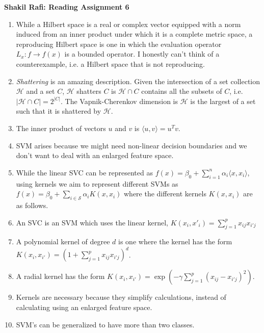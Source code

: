 \documentclass{article}
\begin{document}
\textbf{Shakil Rafi: Reading Assignment 6}
\begin{enumerate}
    \item While a Hilbert space is a real or complex vector equipped with a norm induced from an inner product under which it is a complete metric space, a reproducing Hilbert space is one in which the evaluation operator $L_x: f \rightarrow f(x)$ is a bounded operator. I honestly can't think of a counterexample, i.e. a Hilbert space that is not reproducing.
    \item \textit{Shattering} is an amazing description. Given the intersection of a set collection $\mathcal{H}$ and a set $C$, $\mathcal{H}$ shatters $C$ is $\mathcal{H} \cap C$ contains all the subsets of $C$, i.e. $|\mathcal{H} \cap C| = 2^{|C|}$. The Vapnik-Cherenkov dimension is $\mathcal{H}$ is the largest of a set such that it is shattered by $\mathcal{H}$.
    \item The inner product of vectors $u$ and $v$ is $\langle u,v \rangle = u^Tv$.
    \item SVM arises because we might need non-linear decision boundaries and we don't want to deal with an enlarged feature space.
    \item While the linear SVC can be represented as $f(x) = \beta_0+\sum^n_{i=1} \alpha_i\langle x,x_i \rangle$, using kernels we aim to represent different SVMs as $f(x) = \beta_0 + \sum_{i\in \mathcal{S}} \alpha_i K(x,x_i)$ where the different kernels $K(x,x_i)$ are as follows.
    \item An SVC is an SVM which uses the linear kernel, $K(x_i,x'_i) = \sum^p_{j=1}x_{ij}x_{i'j}$
    \item A polynomial kernel of degree $d$ is one where the kernel has the form $K(x_i,x_{i'}) = (1+\sum^p_{j=1} x_{ij}x_{i'j})^d$.
    \item A radial kernel has the form $K(x_i,x_{i'}) = \exp(-\gamma \sum^p_{j=1}(x_{ij}-x_{i'j})^2)$.
    \item Kernels are necessary because they simplify calculations, instead of calculating using an enlarged feature space.
    \item  SVM's can be generalized to have more than two classes.
\end{enumerate}
\end{document}
